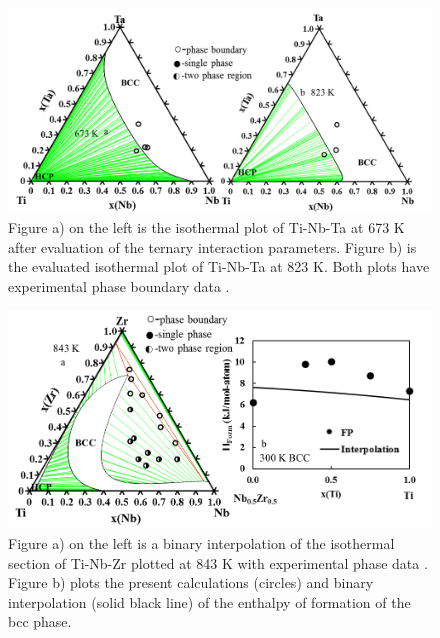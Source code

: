 \newpage
\begin{figure}[H]
	\centering
	\includegraphics[width=\textwidth]{Chapter-3/Figures/TiNbTa2.png}
	\caption{Figure a) on the left is the isothermal plot of Ti-Nb-Ta at 673 K after evaluation of the ternary interaction parameters. Figure b) is the evaluated isothermal plot of Ti-Nb-Ta at 823 K. Both plots have experimental phase boundary data \cite{Na2001}.}
	\label{Ch3-figure:TiNbTa2}
\end{figure}

\newpage
\begin{figure}[H]
	\centering
	\includegraphics[width=\textwidth]{Chapter-3/Figures/TiNbZr.png}
	\caption{Figure a) on the left is a binary interpolation of the isothermal section of Ti-Nb-Zr plotted at 843 K with experimental phase data \cite{Tokunaga2007}. Figure b) plots the present calculations (circles) and binary interpolation (solid black line) of the enthalpy of formation of the bcc phase.}
	\label{Ch3-figure:TiNbZr}
\end{figure}

